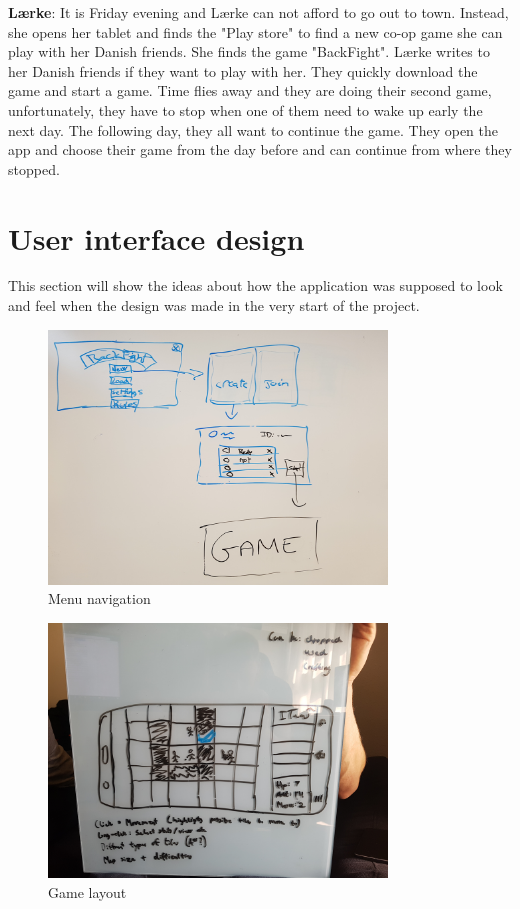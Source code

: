 \textbf{Lærke}:
It is Friday evening and Lærke can not afford to go out to town. Instead, she opens her tablet and finds the "Play store" to find a new co-op game she can play with her Danish friends. She finds the game "BackFight". Lærke writes to her Danish friends if they want to play with her. They quickly download the game and start a game. Time flies away and they are doing their second game, unfortunately, they have to stop when one of them need to wake up early the next day. The following day, they all want to continue the game. They open the app and choose their game from the day before and can continue from where they stopped.

\section{User interface design}
This section will show the ideas about how the application was supposed to look and feel when the design was made in the very start of the project.

\begin{figure}[ht!]
	\centering
	\includegraphics[width=90mm]{images/Gui.png}
	\caption{Menu navigation \label{navigation}}
\end{figure}

\begin{figure}[ht!]
	\centering
	\includegraphics[width=90mm]{images/GameView.png}
	\caption{Game layout \label{layout}}
\end{figure}

